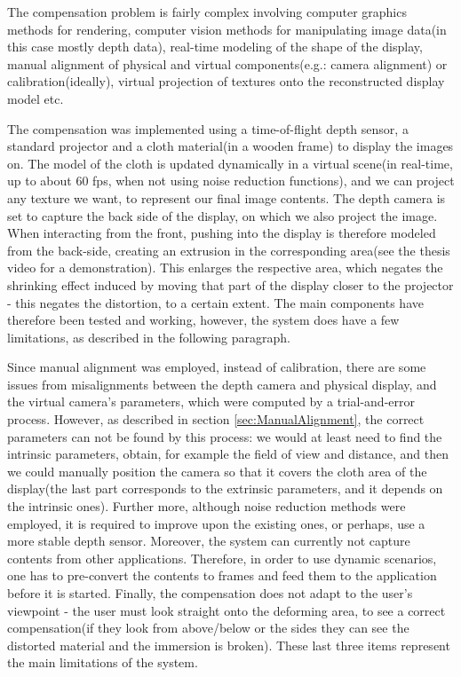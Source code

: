 \documentclass[]{article}
\begin{document}
The compensation problem is fairly complex involving computer graphics methods for rendering, computer vision methods for manipulating image data(in this case mostly depth data), real-time modeling of the shape of the display, manual alignment of physical and virtual components(e.g.: camera alignment) or calibration(ideally), virtual projection of textures onto the reconstructed display model etc. 

The compensation was implemented using a time-of-flight depth sensor, a standard projector and a cloth material(in a wooden frame) to display the images on. The model of the cloth is updated dynamically in a virtual scene(in real-time, up to about 60 fps, when not using noise reduction functions), and we can project any texture we want, to represent our final image contents. The depth camera is set to capture the back side of the display, on which we also project the image. When interacting from the front, pushing into the display is therefore modeled from the back-side, creating an extrusion in the corresponding area(see the thesis video for a demonstration). This enlarges the respective area, which negates the shrinking effect induced by moving that part of the display closer to the projector - this negates the distortion, to a certain extent. The main components have therefore been tested and working, however, the system does have a few limitations, as described in the following paragraph.

Since manual alignment was employed, instead of calibration, there are some issues from misalignments between the depth camera and physical display, and the virtual camera's parameters, which were computed by a trial-and-error process. However, as described in section \ref{sec:ManualAlignment}, the correct parameters can not be found by this process: we would at least need to find the intrinsic parameters, obtain, for example the field of view and distance, and then we could manually position the camera so that it covers the cloth area of the display(the last part corresponds to the extrinsic parameters, and it depends on the intrinsic ones). Further more, although noise reduction methods were employed, it is required to improve upon the existing ones, or perhaps, use a more stable depth sensor. Moreover, the system can currently not capture contents from other applications. Therefore, in order to use dynamic scenarios, one has to pre-convert the contents to frames and feed them to the application before it is started. Finally, the compensation does not adapt to the user's viewpoint - the user must look straight onto the deforming area, to see a correct compensation(if they look from above/below or the sides they can see the distorted material and the immersion is broken). These last three items represent the main limitations of the system. 
\end{document}

